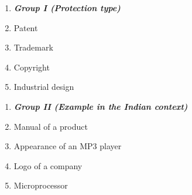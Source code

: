 \documentclass[journal,12pt,onecolumn]{IEEEtran}
\theoremstyle{remark}
\begin{document}
\begin{enumerate}
\noindent
\begin{multicols}{2}
\begin{enumerate}[label=\Alph*.]
    \item[]  \textit{\textbf{Group I (Protection type)}}
    \item Patent
    \item Trademark
    \item Copyright
    \item Industrial design
\end{enumerate}
\columnbreak
\begin{enumerate}[label=\arabic*.]
    \item[] \textit{\textbf{Group II (Example in the Indian context)}}
    \item Manual of a product
    \item Appearance of an MP3 player
    \item Logo of a company
    \item Microprocessor
\end{enumerate}
\end{multicols}


\end{enumerate}
\end{document}
